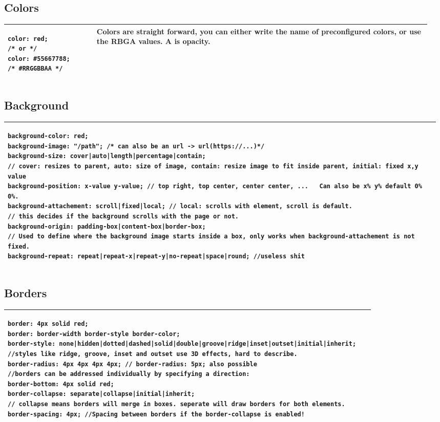 \documentclass[main.tex,fontsize=8pt,paper=a4,paper=portrait,DIV=calc,]{scrartcl}
\begin{document}
\begin{table}[h!]
\subsection{Colors}
\begin{tabular}{|m{0.205\linewidth}|m{0.75\linewidth}|}

\hline
\begin{lstlisting}
color: red;
/* or */
color: #55667788;
/* #RRGGBBAA */
\end{lstlisting}
&
Colors are straight forward, you can either write the name of preconfigured colors, or use the RBGA values. \newline A is opacity.
\\

\hline
\end{tabular}
\subsection{Background}
\begin{tabular}{|m{0.975\linewidth}|}
\hline
\begin{lstlisting}
background-color: red;
background-image: "/path"; /* can also be an url -> url(https://...)*/
background-size: cover|auto|length|percentage|contain;
// cover: resizes to parent, auto: size of image, contain: resize image to fit inside parent, initial: fixed x,y value
background-position: x-value y-value; // top right, top center, center center, ...   Can also be x% y% default 0% 0%.
background-attachement: scroll|fixed|local; // local: scrolls with element, scroll is default.
// this decides if the background scrolls with the page or not.
background-origin: padding-box|content-box|border-box; 
// Used to define where the background image starts inside a box, only works when background-attachement is not fixed.
background-repeat: repeat|repeat-x|repeat-y|no-repeat|space|round; //useless shit
\end{lstlisting}
\\

\hline
\end{tabular}
\subsection{Borders}
\begin{tabular}{|m{0.975\linewidth}|}
\hline
\begin{lstlisting}
border: 4px solid red;
border: border-width border-style border-color;
border-style: none|hidden|dotted|dashed|solid|double|groove|ridge|inset|outset|initial|inherit;
//styles like ridge, groove, inset and outset use 3D effects, hard to describe.
border-radius: 4px 4px 4px 4px; // border-radius: 5px; also possible
//borders can be addressed individually by specifying a direction:
border-bottom: 4px solid red;
border-collapse: separate|collapse|initial|inherit;
// collapse means borders will merge in boxes. seperate will draw borders for both elements.
border-spacing: 4px; //Spacing between borders if the border-collapse is enabled!
\end{lstlisting}\\
\hline
\end{tabular}

\end{table}
\end{document}
